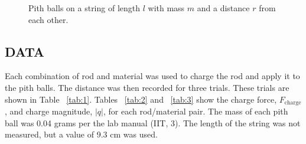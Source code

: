 \documentclass [12pt, letterpaper, twoside]{article}
\begin{document}
\begin{figure}
  \begin{center}
    \caption{Pith balls on a string of length \(l\) with mass \(m\) and a distance \(r\) from each other.}
    \label{fig:1}
  \end{center}
\end{figure}

\subsection*{DATA}
Each combination of rod and material was used to charge the rod and apply it to the pith balls. The distance was then recorded for three trials. These trials are shown in Table ~\ref{tab:1}. Tables ~\ref{tab:2} and ~\ref{tab:3} show the charge force, \(F_{\text{charge}}\), and charge magnitude, \(|q|\), for each rod/material pair. The mass of each pith ball was 0.04 grams per the lab manual (IIT, 3). The length of the string was not measured, but a value of 9.3 cm was used.
\end{document}

